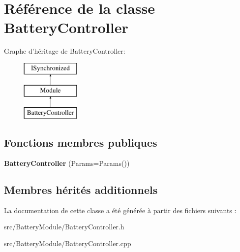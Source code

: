 \hypertarget{classBatteryController}{\section{Référence de la classe Battery\-Controller}
\label{classBatteryController}
}
Graphe d'héritage de Battery\-Controller\-:\begin{figure}[H]
\begin{center}
\leavevmode
\includegraphics[height=3.000000cm]{classBatteryController}
\end{center}
\end{figure}
\subsection*{Fonctions membres publiques}
\begin{DoxyCompactItemize}
\item 
\hypertarget{classBatteryController_a48f46e2aa8ffb576634cdcb0ae172227}{{\bfseries Battery\-Controller} (Params=Params())}\label{classBatteryController_a48f46e2aa8ffb576634cdcb0ae172227}

\end{DoxyCompactItemize}
\subsection*{Membres hérités additionnels}


La documentation de cette classe a été générée à partir des fichiers suivants \-:\begin{DoxyCompactItemize}
\item 
src/\-Battery\-Module/Battery\-Controller.\-h\item 
src/\-Battery\-Module/Battery\-Controller.\-cpp\end{DoxyCompactItemize}

